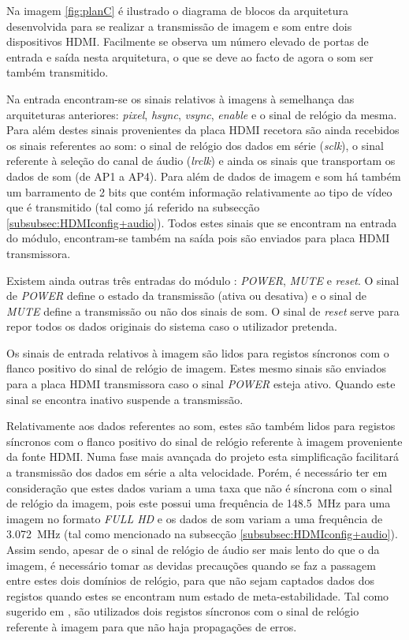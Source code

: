 Na imagem \ref{fig:planC}  é ilustrado o diagrama de blocos da arquitetura desenvolvida para se realizar a transmissão de imagem e som entre dois dispositivos HDMI. Facilmente se observa um número elevado de portas de entrada e saída nesta arquitetura, o que se deve ao facto de agora o som ser também transmitido.

Na entrada encontram-se os sinais relativos à imagens à semelhança das arquiteturas anteriores: \textit{pixel}, \textit{hsync}, \textit{vsync}, \textit{enable} e o sinal de relógio da mesma. Para além destes sinais provenientes da placa HDMI recetora são ainda recebidos os sinais referentes ao som: o sinal de relógio dos dados em série (\textit{sclk}), o sinal referente à seleção do canal de áudio (\textit{lrclk}) e ainda os sinais que transportam os dados de som (de AP1 a AP4). Para além de dados de imagem e som há também um barramento de 2 bits que contém informação relativamente ao tipo de vídeo que é transmitido (tal como já referido na subsecção \ref{subsubsec:HDMIconfig+audio}). Todos estes sinais que se encontram na entrada do módulo, encontram-se também na saída pois são enviados para placa HDMI transmissora.

Existem ainda outras três entradas do módulo : \textit{POWER}, \textit{MUTE} e \textit{reset}. O sinal de \textit{POWER} define o estado da transmissão (ativa ou desativa) e o sinal de \textit{MUTE} define a transmissão ou não dos sinais de som. O sinal de \textit{reset} serve para repor todos os dados originais do sistema caso o utilizador pretenda.

Os sinais de entrada relativos à imagem são lidos para registos síncronos com o flanco positivo do sinal de relógio de imagem. Estes mesmo sinais são enviados para a placa HDMI transmissora caso o sinal \textit{POWER} esteja ativo. Quando este sinal se encontra inativo suspende a transmissão.

Relativamente aos dados referentes ao som, estes são também lidos para registos síncronos com o flanco positivo do sinal de relógio referente à imagem proveniente da fonte HDMI. Numa fase mais avançada do projeto esta simplificação facilitará a transmissão dos dados em série a alta velocidade. Porém, é necessário ter em consideração que estes dados variam a uma taxa que não é síncrona com o sinal de relógio da imagem, pois este possui uma frequência de \SI{148.5}{\mega\hertz} para uma imagem no formato \textit{FULL HD} e os dados de som variam a uma frequência de \SI{3.072}{\mega\hertz} (tal como mencionado na subsecção \ref{subsubsec:HDMIconfig+audio}). Assim sendo, apesar de o sinal de relógio de áudio ser mais lento do que o da imagem, é necessário tomar as devidas precauções quando se faz a passagem entre estes dois domínios de relógio, para que não sejam captados dados dos registos quando estes se encontram num estado de meta-estabilidade. Tal como sugerido em \cite{R024}, são utilizados dois registos síncronos com o sinal de relógio referente à imagem para que não haja propagações de erros.

